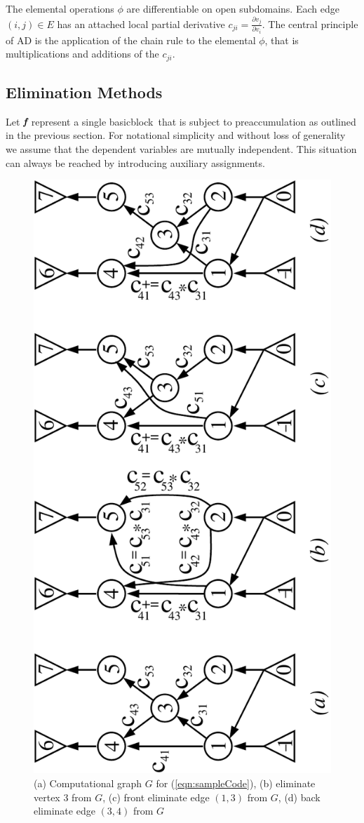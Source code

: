 \documentclass[11pt]{article}
\newcommand{\basicblock}{basicblock}
\newcommand{\bmf}{\mbox{\bf\em f}}
\newcommand{\refeqn}[1]{{(\ref{#1})}}
\begin{document}
The elemental operations $\phi$ are differentiable on open subdomains. 
Each edge $(i,j)\in E$ has an attached local partial derivative 
$c_{ji}=\frac{\partial v_j}{\partial v_i}$. 
The central principle of AD is 
the application of the chain rule to the elemental $\phi$, that is 
multiplications and additions of the  $c_{ji}$.  

\subsection{Elimination Methods} \label{ssec:elimMeth}
Let $\bmf$ represent a single \basicblock\ that is subject to preaccumulation
as outlined in the previous section.
For notational simplicity and without loss of generality we assume that the 
dependent variables are mutually independent. 
This situation can always be
reached by introducing auxiliary assignments.
\begin{figure}
\centering\includegraphics[width=.7\textwidth]{elims}
\caption{
(a) Computational graph $G$ for \refeqn{eqn:sampleCode}, 
(b) eliminate vertex 3 from $G$, 
(c) front eliminate edge $(1,3)$ from $G$, 
(d) back eliminate edge $(3,4)$ from $G$} 
\label{fig:elims}
\end{figure}
\end{document}
